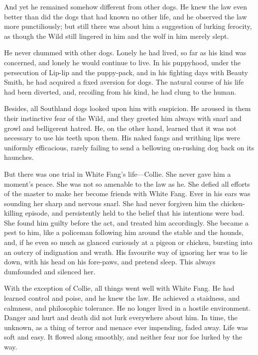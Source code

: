 \documentclass[10pt]{book}
\begin{document}
And yet he remained somehow different from other dogs. He knew the law
even better than did the dogs that had known no other life, and he
observed the law more punctiliously; but still there was about him a
suggestion of lurking ferocity, as though the Wild still lingered in
him and the wolf in him merely slept.

He never chummed with other dogs. Lonely he had lived, so far as his
kind was concerned, and lonely he would continue to live. In his
puppyhood, under the persecution of Lip-lip and the puppy-pack, and in
his fighting days with Beauty Smith, he had acquired a fixed aversion
for dogs. The natural course of his life had been diverted, and,
recoiling from his kind, he had clung to the human.

Besides, all Southland dogs looked upon him with suspicion. He aroused
in them their instinctive fear of the Wild, and they greeted him always
with snarl and growl and belligerent hatred. He, on the other hand,
learned that it was not necessary to use his teeth upon them. His naked
fangs and writhing lips were uniformly efficacious, rarely failing to
send a bellowing on-rushing dog back on its haunches.

But there was one trial in White Fang’s life—Collie. She never gave him
a moment’s peace. She was not so amenable to the law as he. She defied
all efforts of the master to make her become friends with White Fang.
Ever in his ears was sounding her sharp and nervous snarl. She had
never forgiven him the chicken-killing episode, and persistently held
to the belief that his intentions were bad. She found him guilty before
the act, and treated him accordingly. She became a pest to him, like a
policeman following him around the stable and the hounds, and, if he
even so much as glanced curiously at a pigeon or chicken, bursting into
an outcry of indignation and wrath. His favourite way of ignoring her
was to lie down, with his head on his fore-paws, and pretend sleep.
This always dumfounded and silenced her.

With the exception of Collie, all things went well with White Fang. He
had learned control and poise, and he knew the law. He achieved a
staidness, and calmness, and philosophic tolerance. He no longer lived
in a hostile environment. Danger and hurt and death did not lurk
everywhere about him. In time, the unknown, as a thing of terror and
menace ever impending, faded away. Life was soft and easy. It flowed
along smoothly, and neither fear nor foe lurked by the way.
\end{document}
